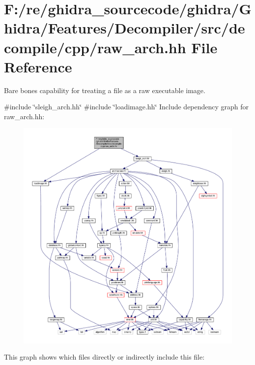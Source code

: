 \hypertarget{raw__arch_8hh}{}\section{F\+:/re/ghidra\+\_\+sourcecode/ghidra/\+Ghidra/\+Features/\+Decompiler/src/decompile/cpp/raw\+\_\+arch.hh File Reference}
\label{raw__arch_8hh}


Bare bones capability for treating a file as a raw executable image.  


{\ttfamily \#include \char`\"{}sleigh\+\_\+arch.\+hh\char`\"{}}\newline
{\ttfamily \#include \char`\"{}loadimage.\+hh\char`\"{}}\newline
Include dependency graph for raw\+\_\+arch.\+hh\+:
\nopagebreak
\begin{figure}[H]
\begin{center}
\leavevmode
\includegraphics[width=350pt]{raw__arch_8hh__incl}
\end{center}
\end{figure}
This graph shows which files directly or indirectly include this file\+:
\nopagebreak
